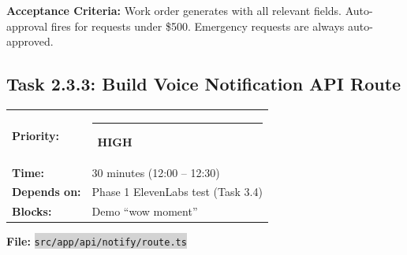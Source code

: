 \documentclass[11pt, a4paper]{article}
\newcommand{\highpri}{\textcolor{highamber}{\rule{6pt}{6pt}}~\textcolor{highamber}{\scriptsize\textbf{HIGH}}}
\newcommand{\code}[1]{\texttt{\small\colorbox{lightgray}{#1}}}
\begin{document}
\textbf{Acceptance Criteria:} Work order generates with all relevant fields. Auto-approval fires for requests under \$500. Emergency requests are always auto-approved.

\vspace{1em}

\subsection{Task 2.3.3: Build Voice Notification API Route}

\begin{tabularx}{\textwidth}{lX}
\textbf{Priority:} & \highpri \\
\textbf{Time:} & 30 minutes (12:00 -- 12:30) \\
\textbf{Depends on:} & Phase 1 ElevenLabs test (Task 3.4) \\
\textbf{Blocks:} & Demo ``wow moment'' \\
\end{tabularx}

\vspace{0.3em}

\textbf{File:} \code{src/app/api/notify/route.ts}
\end{document}
